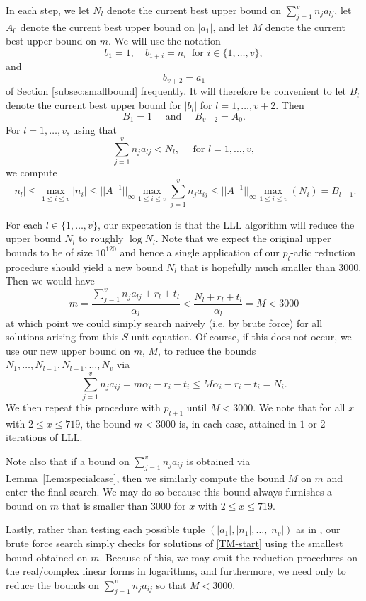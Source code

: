 In each step, we let $N_l$ denote the current best upper bound on $\sum_{j = 1}^v n_ja_{lj}$, let $A_0$ denote the current best upper bound on $|a_1|$, and let $M$ denote the current best upper bound on $m$. We will use the notation 
\[b_1 = 1, \quad b_{1+i} = n_i \ \text{ for } i \in \{1, \dots, v\},\]
and
\[ b_{v+2} = a_1\]
of Section \ref{subsec:smallbound} frequently. It will therefore be convenient to let $B_l$ denote the current best upper bound for $|b_l|$ for $l = 1, \dots, v+2$. Then
\[B_1 = 1 \quad \text{ and } \quad B_{v+2} = A_0.\]
For $l = 1, \dots, v$, using that
\[ \sum_{j = 1}^v n_ja_{lj} < N_l, \quad \text{ for } l = 1, \dots, v,\]
we compute
\[|n_l| \leq \max_{1 \leq i \leq v}|n_i| \leq ||A^{-1}||_{\infty}\max_{1 \leq i\leq v}\sum_{j = 1}^v n_j a_{ij}
\leq ||A^{-1}||_{\infty} \max_{1 \leq i\leq v}(N_i) = B_{l+1}.\]

For each $l \in \{1, \dots, v\}$, our expectation is that the LLL algorithm will reduce the upper bound $N_l$ to roughly $\log{N_l}$. Note that we expect the original upper bounds to be of size $10^{120}$ and hence a single application of our $p_l$-adic reduction procedure should yield a new bound $N_l$ that is hopefully much smaller than $3000$. Then we would have
$$
m = \frac{\sum_{j = 1}^{v}n_ja_{lj} + r_l + t_l}{\alpha_l} < \frac{N_l+ r_l + t_l}{\alpha_l} = M < 3000
$$
at which point we could simply search naively (i.e. by brute force)  for all solutions arising from this $S$-unit equation. Of course, if this does not occur, we use our new upper bound on $m$, $M$, to reduce the bounds $N_1, \dots, N_{l-1}, N_{l+1}, \dots, N_v$ via
\[\sum_{j=1}^v n_ja_{ij} = m\alpha_i - r_i - t_i \leq M\alpha_i - r_i - t_i = N_i.\]
We then repeat this procedure with $p_{l+1}$ until $M < 3000$. We note that for all $x$ with $2 \leq x \leq 719$, the bound $m < 3000$ is, in each case, attained in $1$ or $2$ iterations of LLL.

Note also that if a bound on $\sum_{j = 1}^v n_ja_{ij}$ is obtained via Lemma~\ref{Lem:specialcase}, then we similarly compute the bound $M$ on $m$ and enter the final search. We may do so because this bound always furnishes a bound on $m$ that is smaller than $3000$ for $x$ with $2 \leq x \leq 719$. 

Lastly, rather than testing each possible tuple $(|a_1|,|n_1|, \dots, |n_v|)$ as in \cite{TW3}, our brute force search simply checks for solutions of \eqref{TM-start} using the smallest bound obtained on $m$. Because of this, we may omit the reduction procedures on the real/complex linear forms in logarithms, and furthermore, we need only to reduce the bounds on $\sum_{j = 1}^v n_ja_{ij}$ so that $M < 3000$. 

